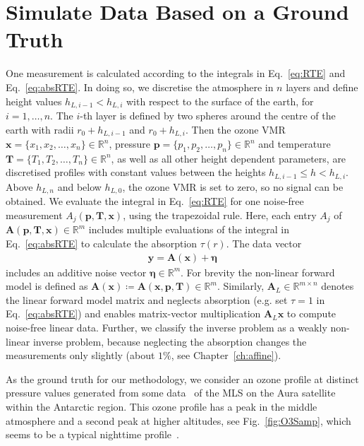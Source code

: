\section{Simulate Data Based on a Ground Truth}
\label{sec:SimDat}
One measurement is calculated according to the integrals in Eq.~\ref{eq:RTE} and Eq.~\ref{eq:absRTE}.
In doing so, we discretise the atmosphere in $n$ layers and define height values $h_{L,i-1} < h_{L,i}$ with respect to the surface of the earth, for $i = 1, \dots, n$.
The $i$-th layer is defined by two spheres around the centre of the earth with radii $ r_0 + h_{L,i-1} $ and $r_0 + h_{L,i}$.
Then the ozone VMR $\bm{x} =\{x_1,x_2,\ldots,x_n\} \in \mathbb{R}^{n}$, pressure $\bm{p} =\{p_1,p_2,\ldots,p_n\} \in \mathbb{R}^{n}$ and temperature $\bm{T} =\{T_1,T_2,\ldots,T_n\} \in \mathbb{R}^{n}$, as well as all other height dependent parameters, are discretised profiles with constant values between the heights $h_{L,i-1} \leq h < h_{L,i}$.
Above $h_{L, n}$ and below $h_{L,0} $, the ozone VMR is set to zero, so no signal can be obtained.
We evaluate the integral in Eq.~\eqref{eq:RTE} for one noise-free measurement $A_{j}(\bm{p},\bm{T},\bm{x})$, using the trapezoidal rule.
Here, each entry $A_{j}$ of $\bm{A}(\bm{p},\bm{T},\bm{x})\in \mathbb{R}^{m}$ includes multiple evaluations of the integral in Eq.~\ref{eq:absRTE} to calculate the absorption $\tau(r)$.
The data vector
\begin{align}
	\bm{y} = \bm{A}(\bm{x}) + \bm{\eta}\, 
\end{align}
includes an additive noise vector $\bm{\eta} \in \mathbb{R}^{m}$.
For brevity the non-linear forward model is defined as $\bm{A}(\bm{x}) \coloneqq \bm{A}(\bm{x},  \bm{p},\bm{T})   \in \mathbb{R}^{m}$.
Similarly, $\bm{A}_L\in \mathbb{R}^{m\times n}$ denotes the linear forward model matrix and neglects absorption (e.g. set $\tau = 1$ in Eq.~\eqref{eq:absRTE}) and enables matrix-vector multiplication $\bm{A}_L \bm{x}$ to compute noise-free linear data.
Further, we classify the inverse problem as a weakly non-linear inverse problem, because neglecting the absorption changes the measurements only slightly (about $1\%$, see Chapter~\ref{ch:affine}).

As the ground truth for our methodology, we consider an ozone profile at distinct pressure values generated from some data~\cite{MLSdata} of the MLS on the Aura satellite within the Antarctic region.
This ozone profile has a peak in the middle atmosphere and a second peak at higher altitudes, see Fig.~\ref{fig:O3Samp}, which seems to be a typical nighttime profile~\cite{Lee2020NightOzone}.

